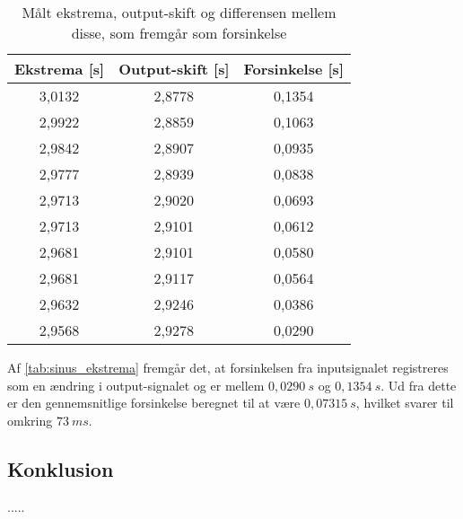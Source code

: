 \begin{table}[H]
\centering
\begin{tabular}{|c|c|c|}
\hline
\textbf{Ekstrema {[}s{]}} & \textbf{Output-skift {[}s{]}} & \textbf{Forsinkelse {[}s{]}} \\ \hline
3,0132                    & 2,8778                        & 0,1354                       \\ \hline
2,9922                    & 2,8859                        & 0,1063                       \\ \hline
2,9842                    & 2,8907                        & 0,0935                       \\ \hline
2,9777                    & 2,8939                        & 0,0838                       \\ \hline
2,9713                    & 2,9020                        & 0,0693                       \\ \hline
2,9713                    & 2,9101                        & 0,0612                       \\ \hline
2,9681                    & 2,9101                        & 0,0580                       \\ \hline
2,9681                    & 2,9117                        & 0,0564                       \\ \hline
2,9632                    & 2,9246                        & 0,0386                       \\ \hline
2,9568                    & 2,9278                        & 0,0290                       \\ \hline
\end{tabular}
\caption{Målt ekstrema, output-skift og differensen mellem disse, som fremgår som forsinkelse}
\label{tab:sinus_ekstrema}
\end{table}

Af \autoref{tab:sinus_ekstrema} fremgår det, at forsinkelsen fra inputsignalet registreres som en ændring  i output-signalet og er mellem $0,0290~s$ og $0,1354~s$. Ud fra dette er den gennemsnitlige forsinkelse beregnet til at være $0,07315~s$, hvilket svarer til omkring $73~ms$. 


\subsection{Konklusion}
.....